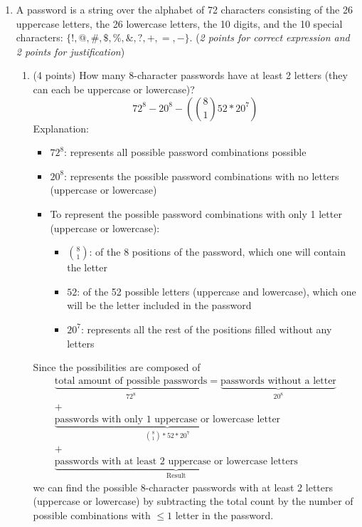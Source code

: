 \documentclass[10pt,letterpaper,unboxed,cm]{article}
\begin{document}
\begin{enumerate}
\begin{enumerate}
\item
A password is a string over the alphabet of 72 characters consisting of the 26 uppercase letters, the 26 lowercase letters, the 10 digits, and the 10 special characters: $\{!,@,\#,\$,\%,\&,?,+,=,-\}$. (\emph{2 points for correct expression and 2 points for justification})

\begin{enumerate}


\item
(4 points)
How many 8-character passwords have at least 2 letters (they can each be uppercase or lowercase)?
$$
    72^8-20^8-(\binom{8}{1}52*20^7)
$$
Explanation:
\begin{itemize}
    \item $72^8$: represents all possible password combinations possible
    \item $20^8$: represents the possible password combinations with no letters (uppercase or lowercase)
    \item To represent the possible password combinations with only 1 letter (uppercase or lowercase):
    \begin{itemize}
        \item $\binom{8}{1}$: of the 8 positions of the password, which one will contain the letter
        \item $52$: of the 52 possible letters (uppercase and lowercase), which one will be the letter included in the password
        \item $20^7$: represents all the rest of the positions filled without any letters
    \end{itemize}
\end{itemize}
Since the possibilities are composed of
\begin{align*}
\underbrace{\text{total amount of possible passwords}}_{72^8} = \underbrace{\text{passwords without a letter}}_{20^8}\\ 
+ \\
\underbrace{\text{passwords with only 1 uppercase or lowercase letter}}_{\binom{8}{1}*52*20^7}\\ 
+ \\
\underbrace{\text{passwords with at least 2 uppercase or lowercase letters}}_{\text{Result}}
\end{align*}
we can find the possible 8-character passwords with at least 2 letters (uppercase or lowercase) by subtracting the total count by the number of possible combinations with $\leq 1$ letter in the password.


\end{enumerate}
\end{enumerate}
\end{enumerate}
\end{document}
